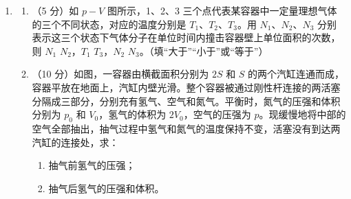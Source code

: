 \documentclass[\gkver]{gaokaozhenti}
\begin{document}
\begin{enumerate}
{由于在 $t_2+3\Delta t\sim t_2+4\Delta t$ 内汽车停止，由运动学公式得 $v_3=v_2-3a\Delta t$⑤，$2as_4=v_3^2$⑥。联立②⑤⑥式，代入已知数据解得 $a=8\Umsq$，$v_2=28\Ums$⑦，或 $a=\frac{288}{25}\Umsq$，$v_2=29.76\Ums$⑧。但⑧式情形下，$v_3<0$，不合题意，舍去。

（3）设汽车的刹车系统稳定工作时，汽车所受阻力的大小为 $f_1$，由牛顿第二定律得 $f_1=ma$⑨。在 $t_1\sim t_2$ 时间内，阻力对汽车冲量的大小为 $I=\frac{1}{2}f_1(t_2-t_1)$⑩。由动量定理得 $I=mv_1-mv_2$\textcircled{\scriptsize 11}。由动能定理，在 $t_1\sim t_2$ 时间内，汽车克服阻力做的功为 $W=\frac{1}{2}mv_1^2-\frac{1}{2}mv_2^2$\textcircled{\scriptsize 12}。联立⑦⑨⑩\textcircled{\scriptsize 11}\textcircled{\scriptsize 12}式，代入已知数据解得 $v_1=30\Ums$\textcircled{\scriptsize 13}，$W=1.16\times10^{5}\UJ$\textcircled{\scriptsize 14}。从司机发现警示牌到汽车停止，汽车行驶的距离 $s$ 约为 $s=v_1t_1+\frac{1}{2}(v_1+v_2)(t_2-t_1)+\frac{v_2^2}{2a}$\textcircled{\scriptsize 15}。联立⑦\textcircled{\scriptsize 13}\textcircled{\scriptsize 15}式，代入已知数据解得 $s=87.5\Um$\textcircled{\scriptsize 16}。
}

\item
\begin{enumerate}
	\item
	（5 分）如 $p-V$ 图所示，1、2、3 三个点代表某容器中一定量理想气体的三个不同状态，对应的温度分别是 $T_1$、$T_2$、$T_3$。用 $N_1$、$N_2$、$N_3$ 分别表示这三个状态下气体分子在单位时间内撞击容器壁上单位面积的次数，则 $N_1$  $N_2$，$T_1$  $T_3$，$N_2$  $N_3$。（填“大于”“小于”或“等于”）
	\item
	（10 分）如图，一容器由横截面积分别为 $2S$ 和 $S$ 的两个汽缸连通而成，容器平放在地面上，汽缸内壁光滑。整个容器被通过刚性杆连接的两活塞分隔成三部分，分别充有氢气、空气和氮气。平衡时，氮气的压强和体积分别为 $p_0$ 和 $V_0$，氢气的体积为 $2V_0$，空气的压强为 $p$。现缓慢地将中部的空气全部抽出，抽气过程中氢气和氮气的温度保持不变，活塞没有到达两汽缸的连接处，求：
	\begin{enumerate}
		\item
		抽气前氢气的压强；
		\item
		抽气后氢气的压强和体积。
	\end{enumerate}
\end{enumerate}
\end{enumerate}
\end{document}
